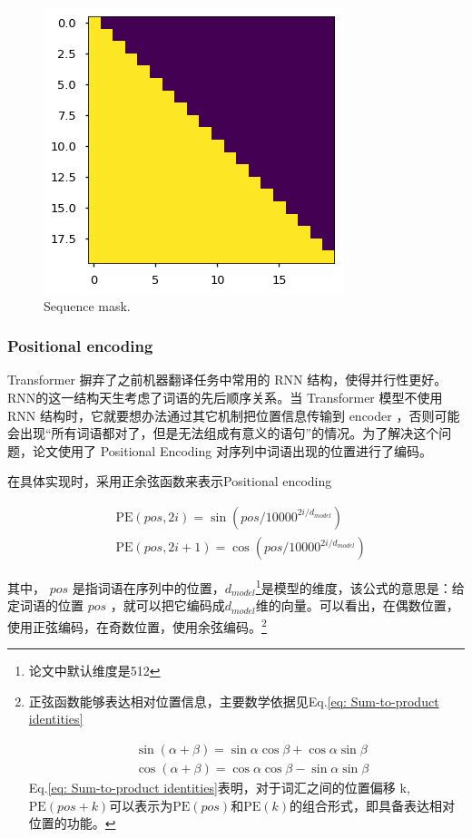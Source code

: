\documentclass[letterpaper,10pt]{article}
\begin{document}
	\begin{figure}[htb]
		\centering 
		\includegraphics[width=0.4\columnwidth]{picture/subsequent_mask}
		\captionsetup{font=scriptsize}
		\caption{
			\label{fig: subsequent mask}Sequence mask.
		}
	\end{figure}
	
	\subsubsection{Positional encoding}

	Transformer 摒弃了之前机器翻译任务中常用的 RNN 结构，使得并行性更好。RNN的这一结构天生考虑了词语的先后顺序关系。当 Transformer 模型不使用 RNN 结构时，它就要想办法通过其它机制把位置信息传输到 encoder ，否则可能会出现“所有词语都对了，但是无法组成有意义的语句”的情况。为了解决这个问题，论文使用了 Positional Encoding 对序列中词语出现的位置进行了编码。
	
	在具体实现时，采用正余弦函数来表示Positional encoding
	
	\begin{equation}
		\begin{aligned}
			& \text{PE}\left(pos, 2i\right) = \sin \left(pos/10000^{2i/d_{model}}\right) \\
			& \text{PE}\left(pos, 2i+1\right) = \cos \left(pos/10000^{2i/d_{model}}\right)
		\end{aligned}
		\label{eq: Positional encoding}
	\end{equation}
	
	其中， $pos$ 是指词语在序列中的位置，$d_{model}$\footnote{论文中默认维度是512}是模型的维度，该公式的意思是：给定词语的位置 $pos$ ，就可以把它编码成$d_{model}$维的向量。可以看出，在偶数位置，使用正弦编码，在奇数位置，使用余弦编码。\footnote{正弦函数能够表达相对位置信息，主要数学依据见Eq.\ref{eq: Sum-to-product identities}	
		
	\begin{equation}
		\begin{aligned}
			& \sin \left(\alpha + \beta \right) = \sin \alpha \cos \beta + \cos \alpha \sin \beta \\
			& \cos \left(\alpha + \beta \right) = \cos \alpha \cos \beta - \sin \alpha \sin \beta
		\end{aligned}
		\label{eq: Sum-to-product identities}
	\end{equation}
	Eq.\ref{eq: Sum-to-product identities}表明，对于词汇之间的位置偏移 k, $\text{PE}(pos + k)$可以表示为$\text{PE}(pos)$和$\text{PE}(k)$的组合形式，即具备表达相对位置的功能。
	}
		
\end{document}
